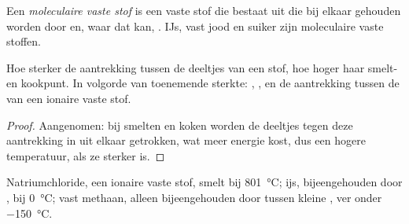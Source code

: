 \begin{definition}\label{def:g11:polarity-and-cohesion:molecular-solid}
Een \emph{moleculaire vaste stof} is een
vaste stof die bestaat uit  die bij elkaar gehouden worden door
 en, waar dat kan, . IJs, vast jood
en suiker zijn moleculaire vaste stoffen.
\end{definition}

\begin{proposition}\label{prop:g11:polarity-and-cohesion:cohesion}
Hoe sterker de aantrekking tussen de deeltjes van een stof, hoe hoger
haar smelt- en kookpunt. In volgorde van toenemende sterkte:
, , en de aantrekking tussen de
 van een ionaire vaste stof.
\end{proposition}

\begin{proof}
Aangenomen: bij smelten en koken worden de deeltjes tegen deze
aantrekking in uit elkaar getrokken, wat meer energie kost, dus een
hogere temperatuur, als ze sterker is.
\end{proof}

\begin{example}\label{ex:g11:polarity-and-cohesion:three}
Natriumchloride, een ionaire vaste stof, smelt bij \qty{801}{\celsius};
ijs, bijeengehouden door , bij \qty{0}{\celsius}; vast
methaan, alleen bijeengehouden door  tussen kleine
, ver onder \qty{-150}{\celsius}.
\end{example}

